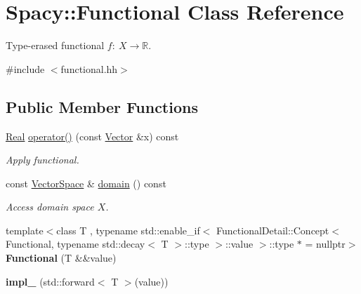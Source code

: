 \hypertarget{classSpacy_1_1Functional}{\section{Spacy\-:\-:Functional Class Reference}
\label{classSpacy_1_1Functional}
}


Type-\/erased functional $f:\ X \to \mathbb{R} $.  




{\ttfamily \#include $<$functional.\-hh$>$}

\subsection*{Public Member Functions}
\begin{DoxyCompactItemize}
\item 
\hypertarget{classSpacy_1_1Functional_af51f903133f2fbf92cf12f790e429919}{\hyperlink{classSpacy_1_1Real}{Real} \hyperlink{classSpacy_1_1Functional_af51f903133f2fbf92cf12f790e429919}{operator()} (const \hyperlink{classSpacy_1_1Vector}{Vector} \&x) const }\label{classSpacy_1_1Functional_af51f903133f2fbf92cf12f790e429919}

\begin{DoxyCompactList}\small\item\em Apply functional. \end{DoxyCompactList}\item 
\hypertarget{classSpacy_1_1Functional_a6f4ada552c025579bcce852316a071be}{const \hyperlink{classSpacy_1_1VectorSpace}{Vector\-Space} \& \hyperlink{classSpacy_1_1Functional_a6f4ada552c025579bcce852316a071be}{domain} () const }\label{classSpacy_1_1Functional_a6f4ada552c025579bcce852316a071be}

\begin{DoxyCompactList}\small\item\em Access domain space $X$. \end{DoxyCompactList}\item 
\hypertarget{classSpacy_1_1Functional_a7cda76dbec505fdf667e6023c064bde9}{{\footnotesize template$<$class T , typename std\-::enable\-\_\-if$<$ Functional\-Detail\-::\-Concept$<$ Functional, typename std\-::decay$<$ T $>$\-::type $>$\-::value $>$\-::type $\ast$  = nullptr$>$ }\\{\bfseries Functional} (T \&\&value)}\label{classSpacy_1_1Functional_a7cda76dbec505fdf667e6023c064bde9}

\item 
\hypertarget{classSpacy_1_1Functional_a286cf483d7cf2f63f022405406508e2a}{{\bfseries impl\-\_\-} (std\-::forward$<$ T $>$(value))}\label{classSpacy_1_1Functional_a286cf483d7cf2f63f022405406508e2a}


\end{DoxyCompactItemize}
